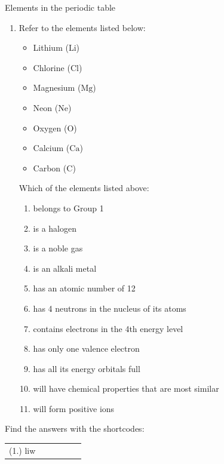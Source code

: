 \begin{exercises}{Elements in the periodic table}
\begin{enumerate}[noitemsep, label=\textbf{\arabic*}. ]
\item            \label{m38760*id262476}Refer to the elements listed below: \label{m38760*id7632}\begin{itemize}[noitemsep]
            \item Lithium ($\mathrm{Li}$)\item Chlorine ($\mathrm{Cl}$)\item Magnesium ($\mathrm{Mg}$)\item Neon ($\mathrm{Ne}$)\item Oxygen ($\mathrm{O}$)\item Calcium ($\mathrm{Ca}$)\item Carbon ($\mathrm{C}$)\end{itemize}
         Which of the elements listed above:
        \label{m38760*id262499}\begin{enumerate}[noitemsep, label=\textbf{\arabic*}. ] 
            \label{m38760*uid158}\item belongs to Group 1
\label{m38760*uid159}\item is a halogen
\label{m38760*uid160}\item is a noble gas
\label{m38760*uid161}\item is an alkali metal
\label{m38760*uid162}\item has an atomic number of 12
\label{m38760*uid163}\item has 4 neutrons in the nucleus of its atoms
\label{m38760*uid164}\item contains electrons in the 4th energy level
\label{m38760*uid165}\item has only one valence electron
\label{m38760*uid166}\item has all its energy orbitals full
\label{m38760*uid167}\item will have chemical properties that are most similar
\label{m38760*uid168}\item will form positive ions
\end{enumerate}
\end{enumerate}
         \par 
\label{m38760**end}
\par {} Find the answers with the shortcodes:
 \par \begin{tabular}[h]{cccccc}
 (1.) liw  & \end{tabular}

\end{exercises}

